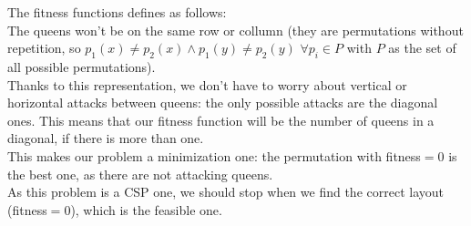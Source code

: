 \documentclass[12pt,english]{article}
\begin{document}
\begin{enumerate}
		The fitness functions defines as follows:\\
		The queens won't be on the same row or collumn (they are permutations without repetition, so $p_1(x) \neq p_2(x) \wedge p_1(y) \neq p_2(y)$ $\forall p_i \in P$ with $P$ as the set of all possible permutations).\\
		Thanks to this representation, we don't have to worry about vertical or horizontal attacks between queens: the only possible attacks are the diagonal ones. This means that our fitness function will be the number of queens in a diagonal, if there is more than one.\\
		This makes our problem a minimization one: the permutation with fitness$=0$ is the best one, as there are not attacking queens.\\
		As this problem is a CSP one, we should stop when we find the correct layout (fitness$=0$), which is the feasible one.



\end{enumerate}
\end{document}
